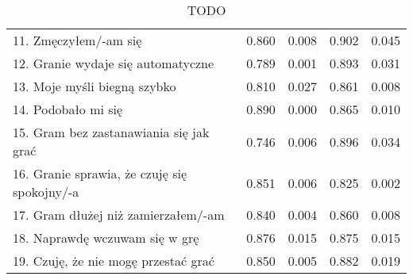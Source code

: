 \begin{table}[h!]
\begin{center}
\begin{tabular}{|m{10em}|m{5em}|m{5em}|m{5em}|m{5em}|}
            11. Zmęczyłem/-am się                                             & 0.860                       & 0.008            & 0.902                   & 0.045        \\
            12. Granie wydaje się automatyczne                                & 0.789                       & 0.001            & 0.893                   & 0.031        \\
            13. Moje myśli \newline biegną szybko                             & 0.810                       & 0.027            & 0.861                   & 0.008        \\
            14. Podobało mi się                                               & 0.890                       & 0.000            & 0.865                   & 0.010        \\
            15. Gram bez zastanawiania się jak grać                           & 0.746                       & 0.006            & 0.896                   & 0.034        \\
            16. Granie sprawia, \newline że czuję się spokojny/-a             & 0.851                       & 0.006            & 0.825                   & 0.002        \\
            17. Gram dłużej \newline niż zamierzałem/-am                      & 0.840                       & 0.004            & 0.860                   & 0.008        \\
            18. Naprawdę wczuwam się w grę                                    & 0.876                       & 0.015            & 0.875                   & 0.015        \\
            19. Czuję, że nie mogę przestać grać                              & 0.850                       & 0.005            & 0.882                   & 0.019        \\
            \hline
        \end{tabular}
    \end{center}
    \caption{TODO}\label{tab1:ch7_11}
\end{table}

